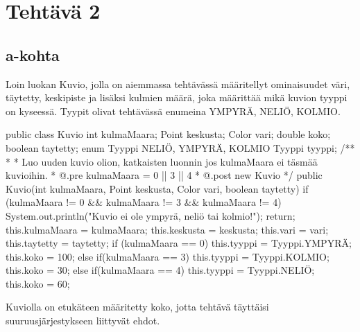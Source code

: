 
\chapter{Tehtävä 2 \label{chap:Teht=0000E4v=0000E4-2}}

\section{a-kohta}
\label{a-kohta}
Loin luokan Kuvio, jolla on aiemmassa tehtävässä määritellyt ominaisuudet väri, täytetty,
keskipiste ja lisäksi kulmien määrä, joka määrittää mikä kuvion tyyppi on kyseessä. Tyypit
olivat tehtävässä enumeina YMPYRÄ, NELIÖ, KOLMIO.
\begin{javacode}
public class Kuvio{
  int kulmaMaara;
  Point keskusta;
  Color vari;
  double koko;
  boolean taytetty;
  enum Tyyppi{
    NELIÖ, YMPYRÄ, KOLMIO
  }
  Tyyppi tyyppi;
  /**
   * 
   * Luo uuden kuvio olion, katkaisten luonnin jos kulmaMaara ei täsmää kuvioihin.
   * @.pre kulmaMaara = 0 || 3 || 4
   * @.post new Kuvio
   */
  public Kuvio(int kulmaMaara, Point keskusta, Color vari, boolean taytetty) {
    if (kulmaMaara != 0 && kulmaMaara != 3 && kulmaMaara != 4) {
      System.out.println("Kuvio ei ole ympyrä, neliö tai kolmio!");
      return;
    }
    this.kulmaMaara = kulmaMaara;
    this.keskusta = keskusta;
    this.vari = vari;
    this.taytetty = taytetty;
    if (kulmaMaara == 0) {
      this.tyyppi = Tyyppi.YMPYRÄ;
      this.koko = 100;
    }
    else if(kulmaMaara == 3){
      this.tyyppi = Tyyppi.KOLMIO;
      this.koko = 30;
    }
    else if(kulmaMaara == 4){
      this.tyyppi = Tyyppi.NELIÖ;
      this.koko = 60;
    }
  }
}
\end{javacode}
Kuviolla on etukäteen määritetty koko, jotta tehtävä täyttäisi suuruusjärjestykseen
liittyvät ehdot.

